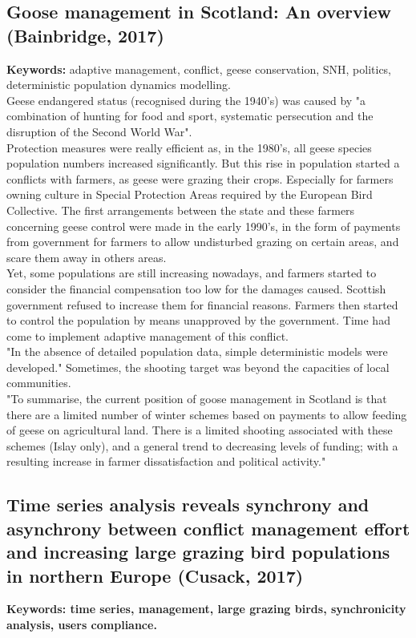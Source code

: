 \documentclass[12pt]{article}
\begin{document}
\subsection{Goose management in Scotland: An overview (Bainbridge, 2017)}
\textbf{Keywords:} adaptive management, conflict, geese conservation, SNH, politics, deterministic population dynamics modelling.\\

Geese endangered status (recognised during the 1940's) was caused by "a combination of
hunting for food and sport, systematic persecution and the
disruption of the Second World War".\\
Protection measures were really efficient as, in the 1980's, all geese species population numbers increased significantly.
But this rise in population started a conflicts with farmers, as geese were grazing their crops.
Especially for farmers owning culture in Special Protection Areas required by the European Bird Collective.
The first arrangements between the state and these farmers concerning geese control were made in the early 1990's, in the form of payments from government for farmers to allow undisturbed grazing on certain areas, and scare them away in others areas.\\
Yet, some populations are still increasing nowadays, and farmers started to consider the financial compensation too low for the damages caused.
Scottish government refused to increase them for financial reasons.
Farmers then started to control the population by means unapproved by the government.
Time had come to implement adaptive management of this conflict.\\	
"In the absence of detailed population data, simple
deterministic models were developed." Sometimes, the shooting target was beyond the capacities of local communities.\\
"To summarise, the current position of goose management in Scotland is that there are a limited number of
winter schemes based on payments to allow feeding of
geese on agricultural land. There is a limited shooting
associated with these schemes (Islay only), and a general
trend to decreasing levels of funding; with a resulting
increase in farmer dissatisfaction and political activity."

\subsection{Time series analysis reveals synchrony and asynchrony between conflict management effort and increasing large grazing bird populations in northern Europe (Cusack, 2017)}
\textbf{Keywords: time series, management, large grazing birds, synchronicity analysis, users compliance.}
\end{document}

